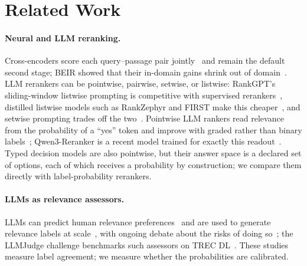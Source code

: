 \section{Related Work}

\paragraph{Neural and LLM reranking.}
Cross-encoders score each query--passage pair jointly~\cite{nogueira2019monobert,nogueira2020monot5} and remain the default second stage; BEIR showed that their in-domain gains shrink out of domain~\cite{thakur2021beir}.
LLM rerankers can be pointwise, pairwise, setwise, or listwise: RankGPT's sliding-window listwise prompting is competitive with supervised rerankers~\cite{sun2023rankgpt}, distilled listwise models such as RankZephyr and FIRST make this cheaper~\cite{pradeep2023rankzephyr,reddy2024first}, and setwise prompting trades off the two~\cite{zhuang2023setwise}.
Pointwise LLM rankers read relevance from the probability of a ``yes'' token and improve with graded rather than binary labels~\cite{zhuang2023beyond}; Qwen3-Reranker is a recent model trained for exactly this readout~\cite{qwen3embedding}.
Typed decision models are also pointwise, but their answer space is a declared set of options, each of which receives a probability by construction; we compare them directly with label-probability rerankers.

\paragraph{LLMs as relevance assessors.}
LLMs can predict human relevance preferences~\cite{thomas2023llmpref} and are used to generate relevance labels at scale~\cite{upadhyay2024umbrela}, with ongoing debate about the risks of doing so~\cite{faggioli2023perspectives,clarke2024cantreplace}; the LLMJudge challenge benchmarks such assessors on TREC DL~\cite{rahmani2024llmjudge}. These studies measure label agreement; we measure whether the probabilities are calibrated.

